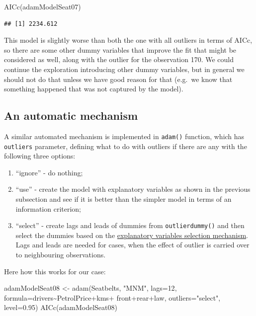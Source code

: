 \documentclass[
]{book}
\newenvironment{Shaded}{\begin{snugshade}}{\end{snugshade}}
\newcommand{\AttributeTok}[1]{\textcolor[rgb]{0.77,0.63,0.00}{#1}}
\newcommand{\DecValTok}[1]{\textcolor[rgb]{0.00,0.00,0.81}{#1}}
\newcommand{\FloatTok}[1]{\textcolor[rgb]{0.00,0.00,0.81}{#1}}
\newcommand{\FunctionTok}[1]{\textcolor[rgb]{0.00,0.00,0.00}{#1}}
\newcommand{\NormalTok}[1]{#1}
\newcommand{\OtherTok}[1]{\textcolor[rgb]{0.56,0.35,0.01}{#1}}
\newcommand{\SpecialCharTok}[1]{\textcolor[rgb]{0.00,0.00,0.00}{#1}}
\newcommand{\StringTok}[1]{\textcolor[rgb]{0.31,0.60,0.02}{#1}}
\providecommand{\tightlist}{%
  \setlength{\itemsep}{0pt}\setlength{\parskip}{0pt}}
\theoremstyle{definition}
\theoremstyle{definition}
\theoremstyle{definition}
\theoremstyle{definition}
\theoremstyle{remark}
\begin{document}
\begin{Shaded}
\begin{Highlighting}[]
\FunctionTok{AICc}\NormalTok{(adamModelSeat07)}
\end{Highlighting}
\end{Shaded}

\begin{verbatim}
## [1] 2234.612
\end{verbatim}

This model is slightly worse than both the one with all outliers in terms of AICc, so there are some other dummy variables that improve the fit that might be considered as well, along with the outlier for the observation 170. We could continue the exploration introducing other dummy variables, but in general we should not do that unless we have good reason for that (e.g.~we know that something happened that was not captured by the model).

\hypertarget{an-automatic-mechanism}{%
\subsection{An automatic mechanism}\label{an-automatic-mechanism}}

A similar automated mechanism is implemented in \texttt{adam()} function, which has \texttt{outliers} parameter, defining what to do with outliers if there are any with the following three options:

\begin{enumerate}
\def\labelenumi{\arabic{enumi}.}
\tightlist
\item
  ``ignore'' - do nothing;
\item
  ``use'' - create the model with explanatory variables as shown in the previous subsection and see if it is better than the simpler model in terms of an information criterion;
\item
  ``select'' - create lags and leads of dummies from \texttt{outlierdummy()} and then select the dummies based on the \protect\hyperlink{ETSXSelection}{explanatory variables selection mechanism}. Lags and leads are needed for cases, when the effect of outlier is carried over to neighbouring observations.
\end{enumerate}

Here how this works for our case:

\begin{Shaded}
\begin{Highlighting}[]
\NormalTok{adamModelSeat08 }\OtherTok{\textless{}{-}} \FunctionTok{adam}\NormalTok{(Seatbelts, }\StringTok{"MNM"}\NormalTok{, }\AttributeTok{lags=}\DecValTok{12}\NormalTok{,}
                        \AttributeTok{formula=}\NormalTok{drivers}\SpecialCharTok{\textasciitilde{}}\NormalTok{PetrolPrice}\SpecialCharTok{+}\NormalTok{kms}\SpecialCharTok{+}
\NormalTok{                          front}\SpecialCharTok{+}\NormalTok{rear}\SpecialCharTok{+}\NormalTok{law,}
                        \AttributeTok{outliers=}\StringTok{"select"}\NormalTok{, }\AttributeTok{level=}\FloatTok{0.95}\NormalTok{)}
\FunctionTok{AICc}\NormalTok{(adamModelSeat08)}
\end{Highlighting}
\end{Shaded}
\end{document}

